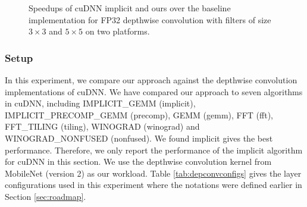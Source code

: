 \begin{figure}[!t]
{	\label{fig:dwspeedupjetsonf5}}
\caption{Speedups of cuDNN implicit and ours over the baseline implementation for FP32 depthwise convolution with filters of size $3 \times 3$ and $5 \times 5$ on two platforms.} \label{fig:dwspeedup}
\end{figure}


%	
%


\subsubsection{Setup} In this experiment, we compare our approach against the depthwise convolution implementations of cuDNN.
We have compared our approach to seven algorithms in cuDNN, including IMPLICIT\_GEMM (implicit), IMPLICIT\_PRECOMP\_GEMM (precomp), GEMM
(gemm), FFT (fft), FFT\_TILING (tiling), WINOGRAD (winograd) and WINOGRAD\_NONFUSED (nonfused). We found implicit gives the best
performance. Therefore, we only report the performance of the implicit algorithm for cuDNN in this section. We use the depthwise
convolution kernel from MobileNet (version 2) as our workload. Table \ref{tab:depconvconfigs} gives the layer configurations used in this
experiment where the notations were defined earlier in Section \ref{sec:roadmap}.

